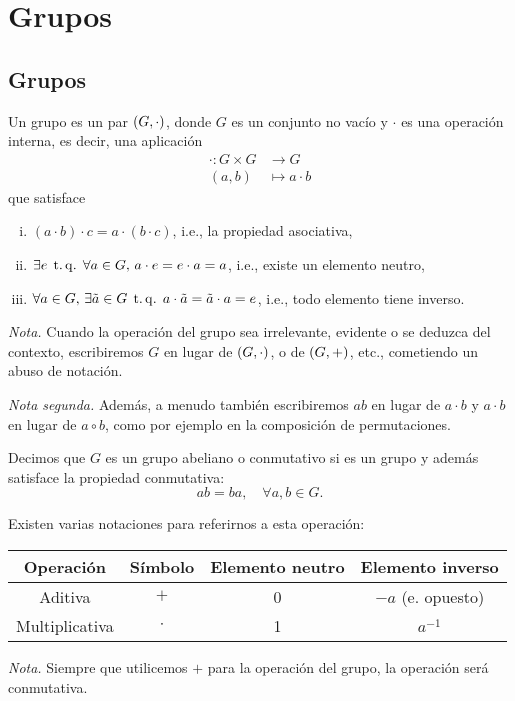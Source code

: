 \chapter{Grupos}

\section{Grupos}

\begin{defi}[grupo]
    Un grupo es un par $\left( G, \cdot \right)$, donde $G$ es un conjunto no vacío y $\cdot$ es una operación interna, es decir, una aplicación
    \[
        \begin{aligned}
            \cdot \colon G \times G &\to G \\
            (a, b) &\mapsto a \cdot b
        \end{aligned}
    \]
    que satisface
    \begin{enumerate}[i)]
        \item $(a\cdot b)\cdot c = a\cdot (b\cdot c)$, i.e., la propiedad asociativa,
        \item $\exists e \operatorname{\;t.q.\;} \forall a \in G, \, a\cdot e = e\cdot a = a$, i.e., existe un elemento neutro,
        \item $\forall a \in G, \, \exists \tilde{a} \in G \operatorname{\;t.q.\;} a \cdot \tilde{a} = \tilde{a}\cdot a = e$, i.e., todo elemento tiene inverso.
    \end{enumerate}
    \emph{Nota.} Cuando la operación del grupo sea irrelevante, evidente o se deduzca del contexto, escribiremos $G$ en lugar de $\left( G, \cdot\right)$, o de $\left( G, +\right)$, etc., cometiendo un abuso de notación.
    
    \vspace{1.15ex}
    
    \noindent \emph{Nota segunda.} Además, a menudo también escribiremos $ab$ en lugar de $a\cdot b$ y $a\cdot b$ en lugar de $a\circ b$, como por ejemplo en la composición de permutaciones.
\end{defi}

\begin{defi}
    Decimos que $G$ es un grupo abeliano o conmutativo si es un grupo y además satisface la propiedad conmutativa:
    \[
        ab = ba, \quad \forall a, b \in G.
    \]
\end{defi}

\begin{obs}
    Existen varias notaciones para referirnos a esta operación:
    \begin{center}
        \begin{tabular}{|c|c|c|c|} \hline
            Operación & S\'imbolo & Elemento neutro & Elemento inverso \\ \hline \hline
            Aditiva & $+$ & 0 & $-a$ (e. opuesto) \\ \hline
            Multiplicativa & $\cdot$ & 1 & $a^{-1}$ \\ \hline
        \end{tabular}
    \end{center}
    \emph{Nota.} Siempre que utilicemos $+$ para la operación del grupo, la operación será conmutativa.
\end{obs}

